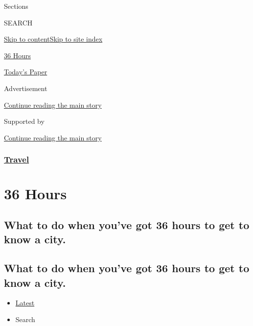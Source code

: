 Sections

SEARCH

\protect\hyperlink{site-content}{Skip to
content}\protect\hyperlink{site-index}{Skip to site index}

\href{https://www.nytimes3xbfgragh.onion/column/36-hours}{36 Hours}

\href{https://myaccount.nytimes3xbfgragh.onion/auth/login?response_type=cookie\&client_id=vi}{}

\href{https://www.nytimes3xbfgragh.onion/section/todayspaper}{Today's
Paper}

Advertisement

\protect\hyperlink{after-top}{Continue reading the main story}

Supported by

\protect\hyperlink{after-sponsor}{Continue reading the main story}

\hypertarget{travel}{%
\subsubsection{\texorpdfstring{\href{/section/travel}{Travel}}{Travel}}\label{travel}}

\hypertarget{36-hours}{%
\section{36 Hours}\label{36-hours}}

\hypertarget{what-to-do-when-youve-got-36-hours-to-get-to-know-a-city}{%
\subsection{What to do when you've got 36 hours to get to know a
city.}\label{what-to-do-when-youve-got-36-hours-to-get-to-know-a-city}}

\hypertarget{what-to-do-when-youve-got-36-hours-to-get-to-know-a-city-1}{%
\subsection{What to do when you've got 36 hours to get to know a
city.}\label{what-to-do-when-youve-got-36-hours-to-get-to-know-a-city-1}}

\begin{itemize}
\tightlist
\item
  \protect\hyperlink{stream-panel}{Latest}
\item
  Search
\end{itemize}

